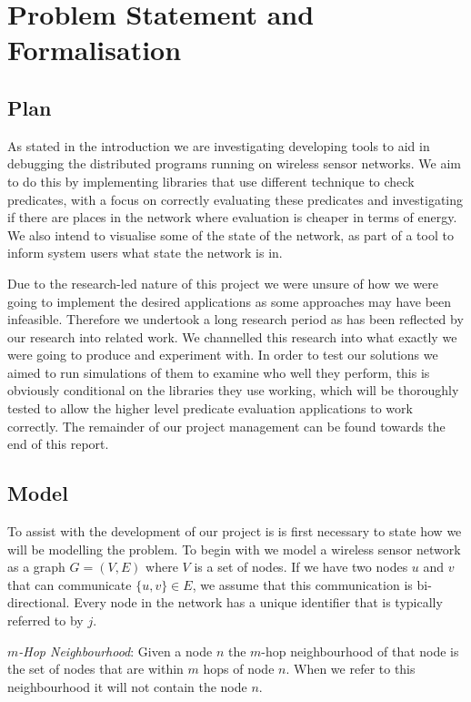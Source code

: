 \section{Problem Statement and Formalisation}

\subsection{Plan}

As stated in the introduction we are investigating developing tools to aid in debugging the distributed programs running on wireless sensor networks. We aim to do this by implementing libraries that use different technique to check predicates, with a focus on correctly evaluating these predicates and investigating if there are places in the network where evaluation is cheaper in terms of energy. We also intend to visualise some of the state of the network, as part of a tool to inform system users what state the network is in.

Due to the research-led nature of this project we were unsure of how we were going to implement the desired applications as some approaches may have been infeasible. Therefore we undertook a long research period as has been reflected by our research into related work. We channelled this research into what exactly we were going to produce and experiment with. In order to test our solutions we aimed to run simulations of them to examine who well they perform, this is obviously conditional on the libraries they use working, which will be thoroughly tested to allow the higher level predicate evaluation applications to  work correctly. The remainder of our project management can be found towards the end of this report.

\subsection{Model}

To assist with the development of our project is is first necessary to state how we will be modelling the problem. To begin with we model a wireless sensor network as a graph $G = (V, E)$ where $V$ is a set of nodes. If we have two nodes $u$ and $v$ that can communicate $\{u, v\} \in E$, we assume that this communication is bi-directional. Every node in the network has a unique identifier that is typically referred to by $j$.

\begin{mydef}
\emph{$m$-Hop Neighbourhood}: Given a node $n$ the $m$-hop neighbourhood of that node is the set of nodes that are within $m$ hops of node $n$. When we refer to this neighbourhood it will not contain the node $n$.
\end{mydef}

